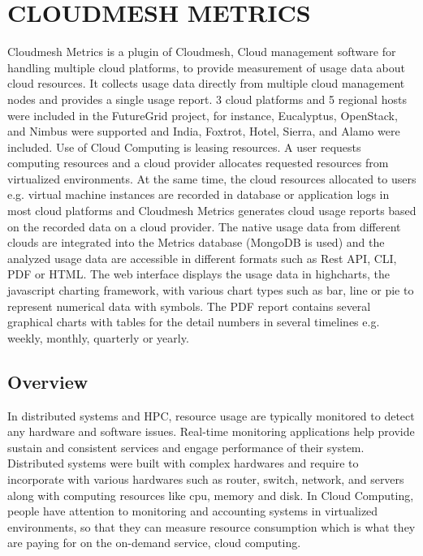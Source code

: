 \documentclass{sig-alternate-05-2015}
\begin{document}
\section{CLOUDMESH METRICS}

Cloudmesh Metrics is a plugin of Cloudmesh, Cloud management software for handling multiple cloud platforms, to provide measurement of usage data about cloud resources. It collects usage data directly from multiple cloud management nodes and provides a single usage report. 3 cloud platforms and 5 regional hosts were included in the FutureGrid project, for instance, Eucalyptus, OpenStack, and Nimbus were supported and India, Foxtrot, Hotel, Sierra, and Alamo were included. Use of Cloud Computing is leasing resources. A user requests computing resources and a cloud provider allocates requested resources from virtualized environments. At the same time, the cloud resources allocated to users e.g. virtual machine instances are recorded in database or application logs in most cloud platforms and Cloudmesh Metrics generates cloud usage reports based on the recorded data on a cloud provider. The native usage data from different clouds are integrated into the Metrics database (MongoDB is used) and the analyzed usage data are accessible in different formats such as Rest API, CLI, PDF or HTML. The web interface displays the usage data in highcharts, the javascript charting framework, with various chart types such as bar, line or pie to represent numerical data with symbols. The PDF report contains several graphical charts with tables for the detail numbers in several timelines e.g. weekly, monthly, quarterly or yearly. 
  
\subsection{Overview}
In distributed systems and HPC, resource usage are typically monitored to detect any hardware and software issues. Real-time monitoring applications help provide sustain and consistent services and engage performance of their system. Distributed systems were built with complex hardwares and require to incorporate with various hardwares such as router, switch, network, and servers along with computing resources like cpu, memory and disk. In Cloud Computing, people have attention to monitoring and accounting systems in virtualized environments, so that they can measure resource consumption which is what they are paying for on the on-demand service, cloud computing. 
\end{document}

